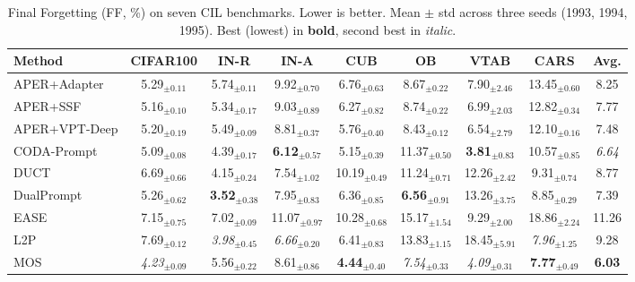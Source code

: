 \begin{table}[!t]
\centering
\caption{Final Forgetting (FF, \%) on seven CIL benchmarks. Lower is better. Mean $\pm$ std across three seeds (1993, 1994, 1995). Best (lowest) in \textbf{bold}, second best in \textit{italic}.}
\label{tab:overall-ff-standalone}
\renewcommand{\arraystretch}{0.95}
\begin{adjustbox}{max width=\textwidth}
\footnotesize
\begin{tabular}{l c c c c c c c c}
\toprule
Method & \textbf{CIFAR100} & \textbf{IN-R} & \textbf{IN-A} & \textbf{CUB} & \textbf{OB} & \textbf{VTAB} & \textbf{CARS} & \textbf{Avg.} \\
\midrule
APER+Adapter & 5.29$_{\pm 0.11}$ & 5.74$_{\pm 0.11}$ & 9.92$_{\pm 0.70}$ & 6.76$_{\pm 0.63}$ & 8.67$_{\pm 0.22}$ & 7.90$_{\pm 2.46}$ & 13.45$_{\pm 0.60}$ & 8.25 \\
APER+SSF & 5.16$_{\pm 0.10}$ & 5.34$_{\pm 0.17}$ & 9.03$_{\pm 0.89}$ & 6.27$_{\pm 0.82}$ & 8.74$_{\pm 0.22}$ & 6.99$_{\pm 2.03}$ & 12.82$_{\pm 0.34}$ & 7.77 \\
APER+VPT-Deep & 5.20$_{\pm 0.19}$ & 5.49$_{\pm 0.09}$ & 8.81$_{\pm 0.37}$ & 5.76$_{\pm 0.40}$ & 8.43$_{\pm 0.12}$ & 6.54$_{\pm 2.79}$ & 12.10$_{\pm 0.16}$ & 7.48 \\
CODA-Prompt & 5.09$_{\pm 0.08}$ & 4.39$_{\pm 0.17}$ & \textbf{6.12}$_{\pm 0.57}$ & 5.15$_{\pm 0.39}$ & 11.37$_{\pm 0.50}$ & \textbf{3.81}$_{\pm 0.83}$ & 10.57$_{\pm 0.85}$ & \textit{6.64} \\
DUCT & 6.69$_{\pm 0.66}$ & 4.15$_{\pm 0.24}$ & 7.54$_{\pm 1.02}$ & 10.19$_{\pm 0.49}$ & 11.24$_{\pm 0.71}$ & 12.26$_{\pm 2.42}$ & 9.31$_{\pm 0.74}$ & 8.77 \\
DualPrompt & 5.26$_{\pm 0.62}$ & \textbf{3.52}$_{\pm 0.38}$ & 7.95$_{\pm 0.83}$ & 6.36$_{\pm 0.85}$ & \textbf{6.56}$_{\pm 0.91}$ & 13.26$_{\pm 3.75}$ & 8.85$_{\pm 0.29}$ & 7.39 \\
EASE & 7.15$_{\pm 0.75}$ & 7.02$_{\pm 0.09}$ & 11.07$_{\pm 0.97}$ & 10.28$_{\pm 0.68}$ & 15.17$_{\pm 1.54}$ & 9.29$_{\pm 2.00}$ & 18.86$_{\pm 2.24}$ & 11.26 \\
L2P & 7.69$_{\pm 0.12}$ & \textit{3.98}$_{\pm 0.45}$ & \textit{6.66}$_{\pm 0.20}$ & 6.41$_{\pm 0.83}$ & 13.83$_{\pm 1.15}$ & 18.45$_{\pm 5.91}$ & \textit{7.96}$_{\pm 1.25}$ & 9.28 \\
MOS & \textit{4.23}$_{\pm 0.09}$ & 5.56$_{\pm 0.22}$ & 8.61$_{\pm 0.86}$ & \textbf{4.44}$_{\pm 0.40}$ & \textit{7.54}$_{\pm 0.33}$ & \textit{4.09}$_{\pm 0.31}$ & \textbf{7.77}$_{\pm 0.49}$ & \textbf{6.03} \\

\end{tabular}
\end{adjustbox}
\end{table}
